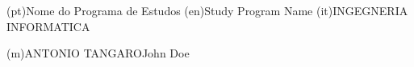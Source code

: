 \ntdegreename*(pt){Nome do Programa de Estudos}
\ntdegreename*(en){Study Program Name}
\ntdegreename*(it){INGEGNERIA INFORMATICA}




\ntauthorname(m){ANTONIO TANGARO}{John Doe}

